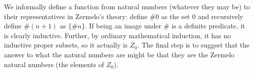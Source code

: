 \documentclass[12pt]{article}
\begin{document}
\begin{enumerate}
We informally define a function from natural numbers (whatever they may be)  to their representatives in Zermelo's theory:  define $\# 0$ as the set $0$ and recursively define
$\# (n+1)$ as $\{\# n\}$.   If being an image under $\#$ is a definite predicate, it is clearly inductive.  Further, by ordinary mathematical induction, it has no inductive proper subsets, so it actually is $Z_0$.  The final step is to suggest that the answer to what the natural numbers are might be that they {\em are\/} the Zermelo natural numbers (the elements of $Z_0$).

\end{enumerate}
\end{document}
